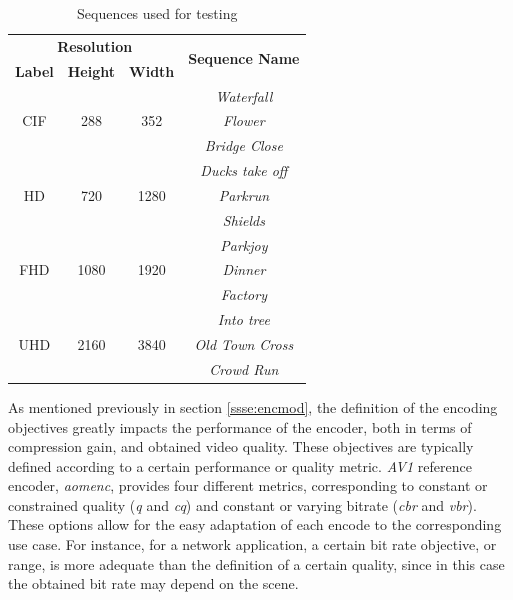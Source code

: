 \begin{table}[!htpb]
    \centering
    \begin{tabular}{cccc} \toprule
        \multicolumn{3}{c}{\textbf{Resolution}}                                 & \multirow{2}{*}{\textbf{Sequence Name}} \\
        \textbf{Label}          & \textbf{Height}       & \textbf{Width}        & \\ \toprule 
        \multirow{3}{*}{CIF}    & \multirow{3}{*}{288}  & \multirow{3}{*}{352}  & \textit{Waterfall}\\
                                &                       &                       & \textit{Flower} \\
                                &                       &                       & \textit{Bridge Close} \\ \hline
        \multirow{3}{*}{HD}     & \multirow{3}{*}{720}  & \multirow{3}{*}{1280} & \textit{Ducks take off}\\
                                &                       &                       & \textit{Parkrun} \\        
                                &                       &                       & \textit{Shields} \\ \hline
        \multirow{3}{*}{FHD}    & \multirow{3}{*}{1080} & \multirow{3}{*}{1920} & \textit{Parkjoy}\\
                                &                       &                       & \textit{Dinner} \\
                                &                       &                       & \textit{Factory} \\ \hline
        \multirow{3}{*}{UHD}    & \multirow{3}{*}{2160} & \multirow{3}{*}{3840} & \textit{Into tree}\\
                                &                       &                       & \textit{Old Town Cross} \\
                                &                       &                       & \textit{Crowd Run} \\ 
        \bottomrule
    \end{tabular}
    \caption{Sequences used for testing}
    \label{tab:seqs}
\end{table}

As mentioned previously in section \ref{ssse:encmod}, the definition of the encoding objectives greatly impacts the performance of the encoder, both in terms of compression gain, and obtained video quality. These objectives are typically defined according to a certain performance or quality metric. \emph{AV1} reference encoder, \emph{aomenc}, provides four different metrics, corresponding to constant or constrained quality (\emph{q} and \emph{cq}) and constant or varying bitrate (\emph{cbr} and \emph{vbr}). These options allow for the easy adaptation of each encode to the corresponding use case. For instance, for a network application, a certain bit rate objective, or range, is more adequate than the definition of a certain quality, since in this case the obtained bit rate may depend on the scene.

